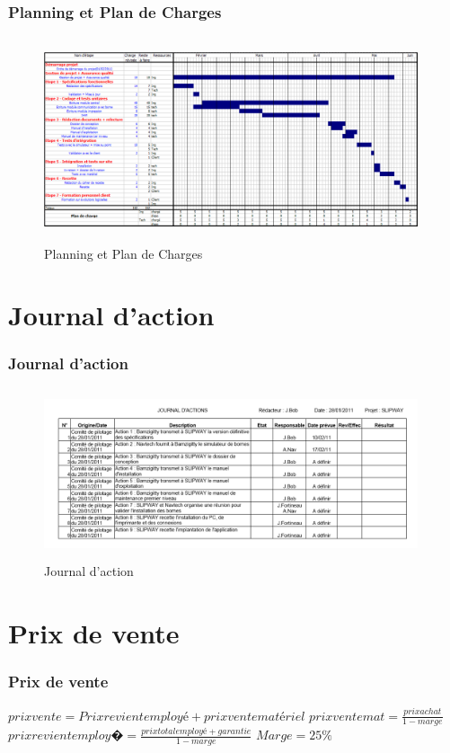 \documentclass{beamer}
\begin{document}
\begin{frame}\frametitle{Planning et Plan de Charges}
\begin{figure}[t]
  		\centering
  		\includegraphics[height=6cm,width=11cm]{images/Planning.PNG}
  		\caption{Planning et Plan de Charges}
  		\label{Planning}
	\end{figure}
\end{frame}

\section{Journal d'action}

\begin{frame}\frametitle{Journal d'action}
\begin{figure}[t]
  		\centering
  		\includegraphics[height=5cm,width=11cm]{images/journal_dactions.PNG}
  		\caption{Journal d'action}
  		\label{JournalAction}
	\end{figure}
\end{frame}



\section{Prix de vente}

\begin{frame}\frametitle{Prix de vente}

$ prix vente= Prix revient employé + prix vente matériel $ 
$ prix vente mat= \frac {prix achat} {1-marge} $
$ prix revient employ� = \frac {prix total employé + garantie} { 1-marge} $
$ Marge = 25\% $

\end{frame}
\end{document}
